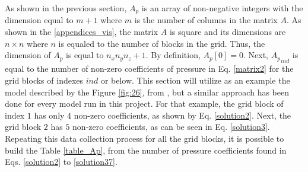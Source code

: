 As shown in the previous section, $A_p$ is an array of non-negative integers with the dimension equal to $m + 1$ where $m$ is the number of columns in the matrix $A$. As shown in the \ref{appendices_vis}, the matrix $A$ is square and its dimensions are $n \times n$ where $n$ is equaled to the number of blocks in the grid. Thus, the dimension of $A_p$ is equal to $n_x n_y n_z + 1$. By definition, ${A_p}[0] = 0$. Next, ${A_p}_{ind}$ is equal to the number of non-zero coefficients of pressure in Eq. \ref{matrix2} for the grid blocks of indexes $ind$ or below. This section will utilize as an example the model described by the Figure \ref{fig:26}, from \cite{Ertekin2001}, but a similar approach has been done for every model run in this project. For that example, the grid block of index $1$ has only $4$ non-zero coefficients, as shown by Eq. \ref{solution2}. Next, the grid block $2$ has $5$ non-zero coefficients, as can be seen in Eq. \ref{solution3}. Repeating this data collection process for all the grid blocks, it is possible to build the Table \ref{table_Ap}, from the number of pressure coefficients found in Eqs. \ref{solution2} to \ref{solution37}.
